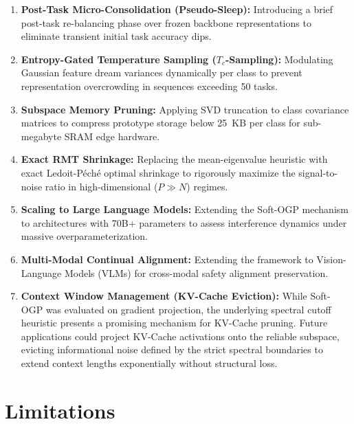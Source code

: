 \documentclass[11pt,a4paper]{article}
\begin{document}
\begin{enumerate}
    \item \textbf{Post-Task Micro-Consolidation (Pseudo-Sleep):} Introducing a brief post-task re-balancing phase over frozen backbone representations to eliminate transient initial task accuracy dips.
    \item \textbf{Entropy-Gated Temperature Sampling ($T_c$-Sampling):} Modulating Gaussian feature dream variances dynamically per class to prevent representation overcrowding in sequences exceeding 50 tasks.
    \item \textbf{Subspace Memory Pruning:} Applying SVD truncation to class covariance matrices to compress prototype storage below 25~KB per class for sub-megabyte SRAM edge hardware.
    \item \textbf{Exact RMT Shrinkage:} Replacing the mean-eigenvalue heuristic with exact Ledoit-Péché optimal shrinkage to rigorously maximize the signal-to-noise ratio in high-dimensional ($P \gg N$) regimes.
    \item \textbf{Scaling to Large Language Models:} Extending the Soft-OGP mechanism to architectures with 70B+ parameters to assess interference dynamics under massive overparameterization.
    \item \textbf{Multi-Modal Continual Alignment:} Extending the framework to Vision-Language Models (VLMs) for cross-modal safety alignment preservation.
    \item \textbf{Context Window Management (KV-Cache Eviction):} While Soft-OGP was evaluated on gradient projection, the underlying spectral cutoff heuristic presents a promising mechanism for KV-Cache pruning. Future applications could project KV-Cache activations onto the reliable subspace, evicting informational noise defined by the strict spectral boundaries to extend context lengths exponentially without structural loss.
\end{enumerate}

\section{Limitations}
\end{document}
